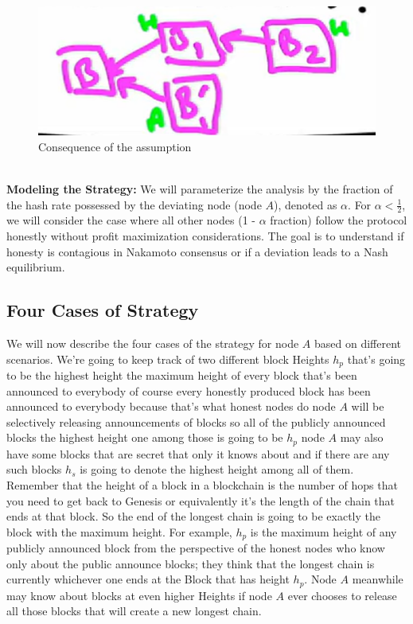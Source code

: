 \begin{figure}[h]
    \centering
    \includegraphics[scale = 0.5]{figures/f43.png}
    \caption{Consequence of the assumption}
    \label{fig:mesh1}
\end{figure}\\

\textbf{Modeling the Strategy: }We will parameterize the analysis by the fraction of the hash rate possessed by the deviating node (node $A$), denoted as $\alpha$. For $\alpha < \frac{1}{2}$, we will consider the case where all other nodes (1 - $\alpha$ fraction) follow the protocol honestly without profit maximization considerations. The goal is to understand if honesty is contagious in Nakamoto consensus or if a deviation leads to a Nash equilibrium.

\subsection{Four Cases of Strategy}
We will now describe the four cases of the strategy for node $A$ based on different scenarios. We're going to keep track of two different block Heights $h_p$ that's going to be the highest height
the maximum height of every block that's been announced to everybody of course every honestly produced block has been
announced to everybody because that's what honest nodes do node $A$ will be selectively releasing announcements of
blocks so all of the publicly announced blocks the highest height one among those is going to be $h_p$ node $A$ may
also have some blocks that are secret that only it knows about and if there are any such blocks $h_s$ is going to
denote the highest height among all of them.\\
Remember that the height of a block in a blockchain is the number of hops that you need to get back to Genesis or
equivalently it's the length of the chain that ends at that block. So
the end of the longest chain is going to be exactly the block with the maximum height. For example, $h_p$ is the maximum height of any publicly announced block
from the perspective of the honest nodes who know only about the public announce blocks; they think that the longest chain
is currently whichever one ends at the Block that has height $h_p$. Node $A$
meanwhile may know about blocks at even higher Heights if node $A$ ever chooses to release all those blocks that will create a new longest chain.

